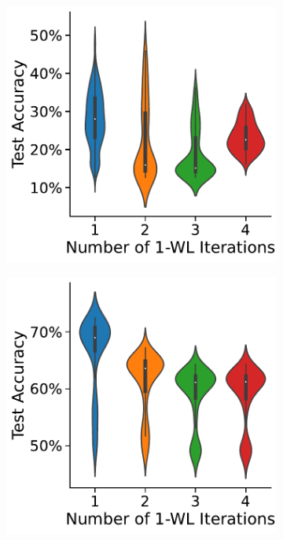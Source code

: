 \begin{figure}[!b]
	\centering
	\begin{subfigure}[b]{0.19\textwidth}
		\centering
		\includegraphics[width=\textwidth]{Figures/k_wl_violin_ENZYMES.pdf}
        \caption{\scriptsize\enzymes}
	\end{subfigure}
	\hfill
	\begin{subfigure}[b]{0.19\textwidth}
		\centering
		\includegraphics[width=\textwidth]{Figures/k_wl_violin_IMDB-BINARY.pdf}

\end{subfigure}
\end{figure}
